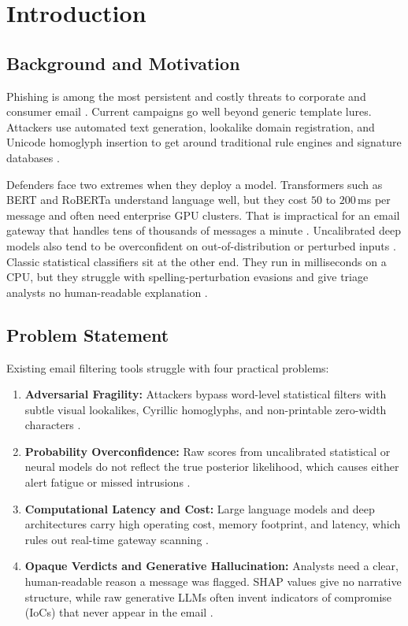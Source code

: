 \documentclass[conference]{IEEEtran}
\begin{document}
\section{Introduction}
\label{sec:intro}

\subsection{Background and Motivation}
Phishing is among the most persistent and costly threats to corporate and consumer email \cite{apwg2024}. Current campaigns go well beyond generic template lures. Attackers use automated text generation, lookalike domain registration, and Unicode homoglyph insertion to get around traditional rule engines and signature databases \cite{alkhoori2020}.

Defenders face two extremes when they deploy a model. Transformers such as BERT and RoBERTa understand language well, but they cost $50$ to $200$\,ms per message and often need enterprise GPU clusters. That is impractical for an email gateway that handles tens of thousands of messages a minute \cite{almoqren2024}. Uncalibrated deep models also tend to be overconfident on out-of-distribution or perturbed inputs \cite{guo2017}. Classic statistical classifiers sit at the other end. They run in milliseconds on a CPU, but they struggle with spelling-perturbation evasions and give triage analysts no human-readable explanation \cite{chakravorty2026}.

\subsection{Problem Statement}
Existing email filtering tools struggle with four practical problems:
\begin{enumerate}
    \item \textbf{Adversarial Fragility:} Attackers bypass word-level statistical filters with subtle visual lookalikes, Cyrillic homoglyphs, and non-printable zero-width characters \cite{dhamija2006}.
    \item \textbf{Probability Overconfidence:} Raw scores from uncalibrated statistical or neural models do not reflect the true posterior likelihood, which causes either alert fatigue or missed intrusions \cite{niculescu2005}.
    \item \textbf{Computational Latency and Cost:} Large language models and deep architectures carry high operating cost, memory footprint, and latency, which rules out real-time gateway scanning \cite{alsubaiey2024}.
    \item \textbf{Opaque Verdicts and Generative Hallucination:} Analysts need a clear, human-readable reason a message was flagged. SHAP values give no narrative structure, while raw generative LLMs often invent indicators of compromise (IoCs) that never appear in the email \cite{ji2023}.
\end{enumerate}
\end{document}
